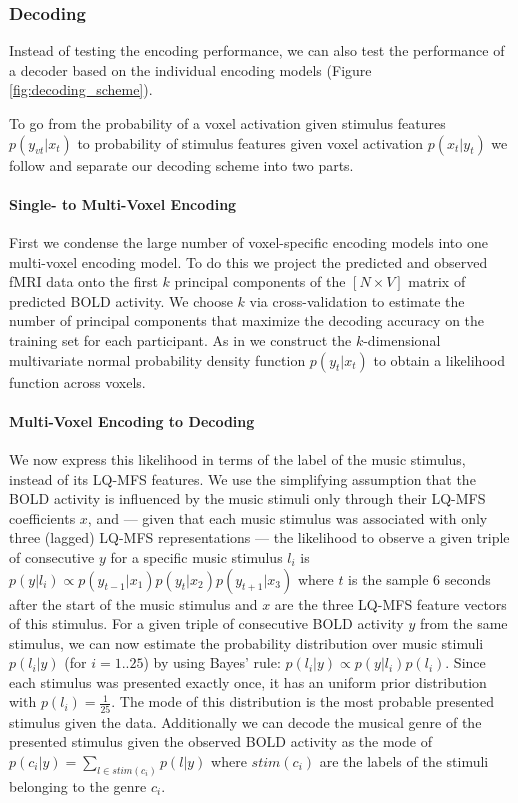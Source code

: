 \subsubsection*{Decoding}

Instead of testing the encoding performance, we can also test the performance
of a decoder based on the individual encoding models \citep{NG11} (Figure
\ref{fig:decoding_scheme}).

To go from the probability of a voxel activation
given stimulus features $p(y_{vt}|x_{t})$ to probability of stimulus features
given voxel activation $p(x_{t}|y_{t})$ we follow \citet{NG09} and separate our
decoding scheme into two parts. 

\paragraph{Single- to Multi-Voxel Encoding}

First we condense the large number of voxel-specific encoding models into one
multi-voxel encoding model.  To do this we project the predicted and observed
f{MRI} data onto the first $k$ principal components of the $[N\times V]$ matrix
of predicted BOLD activity. We choose $k$ via cross-validation to estimate the
number of principal components that maximize the decoding accuracy on the
training set for each participant.
As in \citet{NG09} we construct the $k$-dimensional multivariate normal
probability density function $p(y_{t}|x_{t})$ to obtain a likelihood function
across voxels. 

\paragraph{Multi-Voxel Encoding to Decoding}

We now express this likelihood in terms of the label of the music stimulus, instead of its LQ-MFS features.  We
use the simplifying assumption that the BOLD activity is influenced by the
music stimuli only through their LQ-MFS coefficients $x$, and --- given that
each music stimulus was associated with only three (lagged) LQ-MFS
representations --- the likelihood to observe a given triple of consecutive $y$
for a specific music stimulus $l_{i}$ is $p(y|l_{i}) \propto
p(y_{t-1}|x_{1})p(y_{t}|x_{2})p(y_{t+1}|x_{3})$ where $t$ is the sample 6
seconds after the start of the music stimulus and $x$ are the three LQ-MFS
feature vectors of this stimulus.  For a given triple of consecutive BOLD
activity $y$ from the same stimulus, we can now estimate the probability
distribution over music stimuli $p(l_{i}|y)$ (for $i=1..25$) by using Bayes'
rule: $p(l_{i}|y) \propto p(y|l_{i})p(l_{i})$.
Since each stimulus was presented exactly once,
it has an uniform prior distribution with $p(l_{i})=\frac{1}{25}$. The mode of
this distribution is the most probable presented stimulus given the data. 
Additionally we can decode the musical genre of the presented stimulus given the observed
BOLD activity as the mode of $p(c_{i}|y) = \sum\nolimits_{l \in
  stim(c_{i})} p(l|y)$ where $stim(c_{i})$ are the labels of the stimuli
  belonging to the genre $c_{i}$. 


